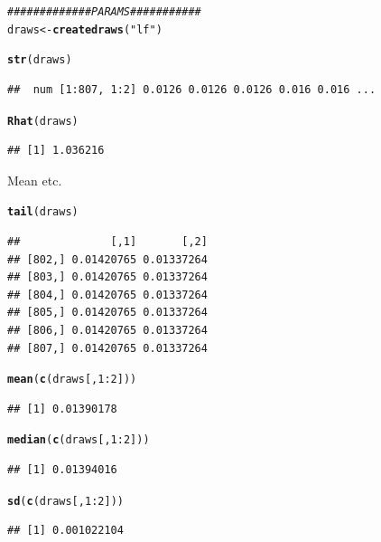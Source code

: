 \documentclass{article}\usepackage[]{graphicx}\usepackage[]{color}
\makeatletter
\newcommand{\hlnum}[1]{\textcolor[rgb]{0.686,0.059,0.569}{#1}}%
\newcommand{\hlstr}[1]{\textcolor[rgb]{0.192,0.494,0.8}{#1}}%
\newcommand{\hlcom}[1]{\textcolor[rgb]{0.678,0.584,0.686}{\textit{#1}}}%
\newcommand{\hlopt}[1]{\textcolor[rgb]{0,0,0}{#1}}%
\newcommand{\hlstd}[1]{\textcolor[rgb]{0.345,0.345,0.345}{#1}}%
\newcommand{\hlkwb}[1]{\textcolor[rgb]{0.69,0.353,0.396}{#1}}%
\newcommand{\hlkwd}[1]{\textcolor[rgb]{0.737,0.353,0.396}{\textbf{#1}}}%
\newenvironment{kframe}{%
 \def\at@end@of@kframe{}%
 \ifinner\ifhmode%
  \def\at@end@of@kframe{\end{minipage}}%
  \begin{minipage}{\columnwidth}%
 \fi\fi%
 \def\FrameCommand##1{\hskip\@totalleftmargin \hskip-\fboxsep
 \colorbox{shadecolor}{##1}\hskip-\fboxsep
     \hskip-\linewidth \hskip-\@totalleftmargin \hskip\columnwidth}%
 \MakeFramed {\advance\hsize-\width
   \@totalleftmargin\z@ \linewidth\hsize
   \@setminipage}}%
 {\par\unskip\endMakeFramed%
 \at@end@of@kframe}
\newenvironment{knitrout}{}{} %
\makeatother
\begin{document}
\begin{knitrout}
\color{fgcolor}\begin{kframe}
\begin{alltt}
\hlcom{############# PARAMS###########}
\hlstd{draws} \hlkwb{<-} \hlkwd{createdraws}\hlstd{(}\hlstr{"lf"}\hlstd{)}

\hlkwd{str}\hlstd{(draws)}
\end{alltt}
\begin{verbatim}
##  num [1:807, 1:2] 0.0126 0.0126 0.0126 0.016 0.016 ...
\end{verbatim}
\begin{alltt}
\hlkwd{Rhat}\hlstd{(draws)}
\end{alltt}
\begin{verbatim}
## [1] 1.036216
\end{verbatim}
\end{kframe}
\end{knitrout}

Mean etc.

\begin{knitrout}
\color{fgcolor}\begin{kframe}
\begin{alltt}
\hlkwd{tail}\hlstd{(draws)}
\end{alltt}
\begin{verbatim}
##              [,1]       [,2]
## [802,] 0.01420765 0.01337264
## [803,] 0.01420765 0.01337264
## [804,] 0.01420765 0.01337264
## [805,] 0.01420765 0.01337264
## [806,] 0.01420765 0.01337264
## [807,] 0.01420765 0.01337264
\end{verbatim}
\begin{alltt}
\hlkwd{mean}\hlstd{(}\hlkwd{c}\hlstd{(draws[,} \hlnum{1}\hlopt{:}\hlnum{2}\hlstd{]))}
\end{alltt}
\begin{verbatim}
## [1] 0.01390178
\end{verbatim}
\begin{alltt}
\hlkwd{median}\hlstd{(}\hlkwd{c}\hlstd{(draws[,} \hlnum{1}\hlopt{:}\hlnum{2}\hlstd{]))}
\end{alltt}
\begin{verbatim}
## [1] 0.01394016
\end{verbatim}
\begin{alltt}
\hlkwd{sd}\hlstd{(}\hlkwd{c}\hlstd{(draws[,} \hlnum{1}\hlopt{:}\hlnum{2}\hlstd{]))}
\end{alltt}
\begin{verbatim}
## [1] 0.001022104
\end{verbatim}
\end{kframe}
\end{knitrout}
\end{document}

